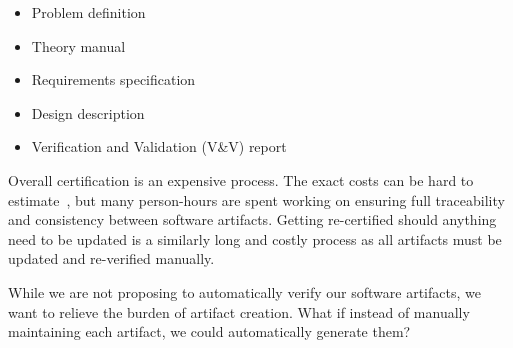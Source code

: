 \documentclass[twocolumn]{article}
\begin{document}
\begin{itemize}
\itemsep-.2em
\item Problem definition
\item Theory manual
\item Requirements specification
\item Design description
\item Verification and Validation (V\&V) report
\end{itemize}

Overall certification is an expensive process. The exact costs can be hard to 
estimate~\cite{HatcliffEtAl2009}, but many person-hours are spent 
working on ensuring full traceability and consistency between software 
artifacts. Getting re-certified should anything need to be updated is a 
similarly long and costly process as all artifacts must be updated and 
re-verified manually.

While we are not proposing to automatically verify our software artifacts, we 
want to relieve the burden of artifact creation. What if instead of manually 
maintaining each artifact, we could automatically generate them? 




  
\end{document}
